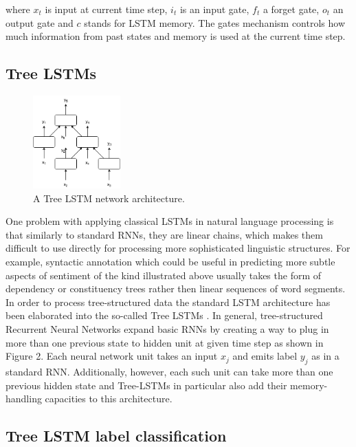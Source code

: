 \documentclass[10pt, a4paper]{article}
\begin{document}
		where $x_t$ is input at current time step, $i_t$ is an input gate, $f_t$ a forget gate, $o_t$ an output gate and $c$ stands for LSTM memory.
		The gates mechanism controls how much information from past states and memory is used at the current time step. 

\subsection{Tree LSTMs}
\begin{figure}[h]
	\begin{center}
		\includegraphics[width=0.3\textwidth]{imgs/tree-lstm}
		\caption{A Tree LSTM network architecture.}
		\label{tab:tree-lstm}
	\end{center}
\end{figure}
	One problem with applying classical LSTMs in natural language processing is that similarly to standard RNNs, they are linear chains, which makes them difficult to use directly for processing more sophisticated linguistic structures. For example, syntactic annotation which could be useful in predicting more subtle aspects of sentiment of the kind illustrated above usually takes the form of dependency or constituency trees rather then linear sequences of word segments. In order to process tree-structured data the standard LSTM architecture has been elaborated into the so-called Tree LSTMs \cite{tai2015improved}.
	In general, tree-structured Recurrent Neural Networks expand basic RNNs by creating a way to plug in more than one previous state to hidden unit at given time step as shown in Figure 2. Each neural network unit takes an input $x_j$ and emits label $y_j$ as in a standard RNN. Additionally, however, each such unit can take more than one previous hidden state and Tree-LSTMs in particular also add their memory-handling capacities to this architecture.
	
\subsection{Tree LSTM label classification}
\end{document}
